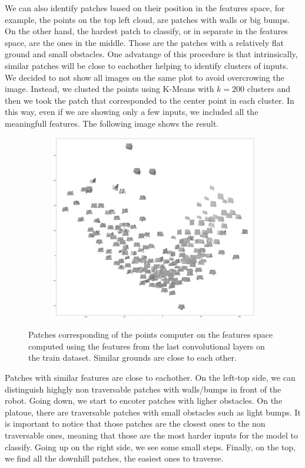 \documentclass[../document.tex]{subfiles}
\begin{document}
We can also identify patches based on their position in the features space, for example, the points on the top left cloud, are patches with walls or big bumps. On the other hand, the hardest patch to classify, or in separate in the features space, are the ones in the middle. Those are the patches with a relatively flat ground and small obstacles. One advatange of this procedure is that intrinsically, similar patches will be close to eachother helping to identify clusters of inputs. We decided to not show all images on the same plot to avoid overcrowing the image. Instead, we clusted the points using K-Means with $k=200$ clusters and then we took the patch that corresponded to the center point in each cluster. In this way, even if we are showing only a few inputs, we included all the meaningfull features. The following image shows the result. 
\begin{figure}[H]
    \centering
    \begin{subfigure}[b]{1\textwidth}
        \includegraphics[width=\linewidth]{../img/5/pca/pca-patches-200.png}
    \end{subfigure}
\caption{Patches corresponding of the points computer on the features space computed using the features from the last convolutional layers on the train dataset. Similar grounds are close to each other.}
\end{figure}
Patches with similar features are close to eachother. On the left-top side, we can distinguish highgly non traversable patches with walls/bumps in front of the robot. Going down, we start to encoter patches with ligher obstacles. On the platoue, there are traversable patches with small obstacles such as light bumps. It is important to notice that those patches are the closest ones to the non traversable ones, meaning that those are the most harder inputs for the model to classify. Going up on the right side, we see some small steps. Finally, on the top, we find all the downhill patches, the easiest ones to traverse.
\end{document}
